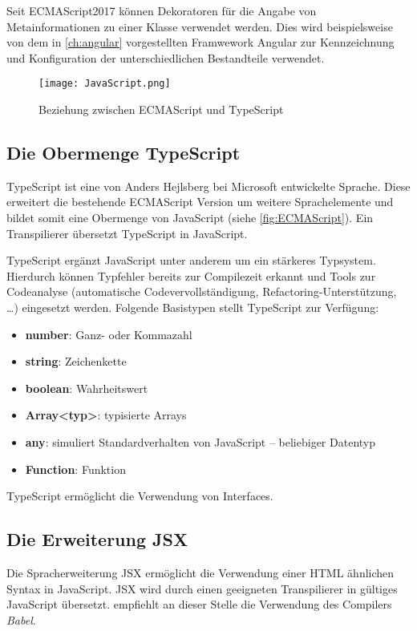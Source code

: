Seit ECMAScript2017 können Dekoratoren für die Angabe von Metainformationen zu einer Klasse verwendet werden. Dies wird beispielsweise von dem in \autoref{ch:angular} vorgestellten Framwework Angular zur Kennzeichnung und Konfiguration der unterschiedlichen Bestandteile verwendet.\autocites[vgl.][30\psqq]{Woiwode.2018} 

\begin{figure}[h]
	\centering
	\texttt{[image: JavaScript.png]}
	\caption{Beziehung zwischen ECMAScript und TypeScript} 
	\label{fig:ECMAScript}
\end{figure}

\subsection{Die Obermenge TypeScript}\label{sec:ts}
TypeScript ist eine von Anders Hejlsberg bei Microsoft entwickelte Sprache. Diese erweitert die bestehende ECMAScript Version um weitere Sprachelemente und bildet somit eine Obermenge von JavaScript (siehe \autoref{fig:ECMAScript}). Ein Transpilierer übersetzt TypeScript in JavaScript. 

TypeScript ergänzt JavaScript unter anderem um ein stärkeres Typsystem. Hierdurch können Typfehler bereits zur Compilezeit erkannt und Tools zur Codeanalyse (automatische Codevervollständigung, Refactoring-Unterstützung, …) eingesetzt werden.\autocites[vgl.][27\psqq]{Woiwode.2018}[vgl.][13\psqq]{Steyer.2017}[vgl.][10]{Zeigermann.2016} Folgende Basistypen stellt TypeScript zur Verfügung: \autocites[vgl.][34\psqq]{Woiwode.2018}[vgl.][16\psqq]{Steyer.2017}

\begin{itemize}
	\item  \textbf{number}: Ganz- oder Kommazahl
	\item \textbf{string}:  Zeichenkette
	\item \textbf{boolean}: Wahrheitswert
	\item \textbf{Array<typ>}: typisierte Arrays
	\item \textbf{any}: simuliert Standardverhalten von JavaScript  – beliebiger Datentyp
	\item \textbf{Function}: Funktion
\end{itemize}
TypeScript ermöglicht die Verwendung von Interfaces. \autocites[vgl.][40\psq]{Woiwode.2018}

\subsection{Die Erweiterung JSX}\label{sec:die-erweiterung-jsx}
\label{Babel}
Die Spracherweiterung JSX ermöglicht die Verwendung einer HTML ähnlichen Syntax in JavaScript. JSX wird durch einen geeigneten Transpilierer in gültiges JavaScript übersetzt.\textcite[vgl.][10]{Zeigermann.2016} empfiehlt an dieser Stelle die Verwendung des Compilers \textit{Babel}.

